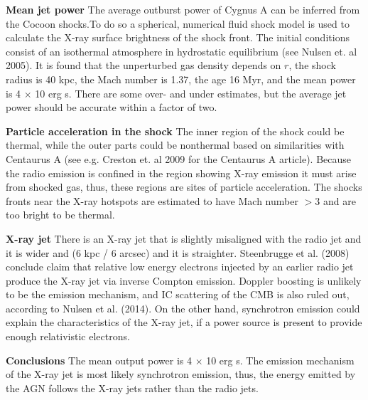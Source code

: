 \documentclass[MScProj_TLRH_ClusterEnergy.tex]{subfiles}
\begin{document}
\textbf{Mean jet power}
The average outburst power of Cygnus A can be inferred from the Cocoon shocks.To do so a spherical, numerical fluid shock model is used to calculate the X-ray surface brightness of the shock front. The initial conditions consist of an isothermal atmosphere in hydrostatic equilibrium (see Nulsen et. al 2005). It is found that the unperturbed gas density depends on $r$, the shock radius is 40 kpc, the Mach number is 1.37, the age 16 Myr, and the mean power is 4 $\times$ 10 erg s. There are some over- and under estimates, but the average jet power should be accurate within a factor of two.

\textbf{Particle acceleration in the shock}
The inner region of the shock could be thermal, while the outer parts could be nonthermal based on similarities with Centaurus A (see e.g. Creston et. al 2009 for the Centaurus A article). Because the radio emission is confined in the region showing X-ray emission it must arise from shocked gas, thus, these regions are sites of particle acceleration. The shocks fronts near the X-ray hotspots are estimated to have Mach number $>$3 and are too bright to be thermal.

\textbf{X-ray jet}
There is an X-ray jet that is slightly misaligned with the radio jet and it is wider and (6 kpc / 6 arcsec) and it is straighter. Steenbrugge et al. (2008) conclude claim that relative low energy electrons injected by an earlier radio jet produce the X-ray jet via inverse Compton emission. Doppler boosting is unlikely to be the emission mechanism, and IC scattering of the CMB is also ruled out, according to Nulsen et al. (2014). On the other hand, synchrotron emission could explain the characteristics of the X-ray jet, if a power source is present to provide enough relativistic electrons.

\textbf{Conclusions}
The mean output power is 4 $\times$ 10 erg s. The emission mechanism of the X-ray jet is most likely synchrotron emission, thus, the energy emitted by the AGN follows the X-ray jets rather than the radio jets.

\SubfileBibliography
\end{document}
